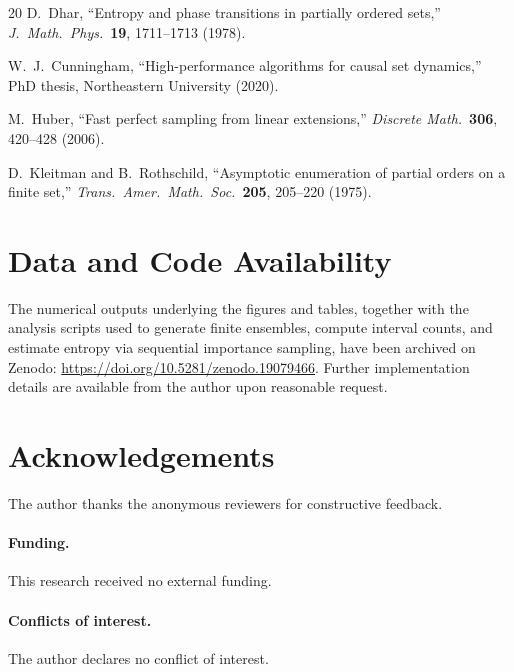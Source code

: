 \documentclass[12pt,a4paper]{article}
\begin{document}
\begin{thebibliography}{20}
D.~Dhar,
``Entropy and phase transitions in partially ordered sets,''
\emph{J.\ Math.\ Phys.}\ \textbf{19}, 1711--1713 (1978).

W.~J.~Cunningham,
``High-performance algorithms for causal set dynamics,''
PhD thesis, Northeastern University (2020).

M.~Huber,
``Fast perfect sampling from linear extensions,''
\emph{Discrete Math.}\ \textbf{306}, 420--428 (2006).

D.~Kleitman and B.~Rothschild,
``Asymptotic enumeration of partial orders on a finite set,''
\emph{Trans.\ Amer.\ Math.\ Soc.}\ \textbf{205}, 205--220 (1975).

\end{thebibliography}

\section*{Data and Code Availability}
The numerical outputs underlying the figures and tables,
together with the analysis scripts used to generate finite ensembles,
compute interval counts, and estimate entropy via sequential importance
sampling, have been archived on Zenodo:
\url{https://doi.org/10.5281/zenodo.19079466}.
Further implementation details are available from the author upon
reasonable request.

\section*{Acknowledgements}
The author thanks the anonymous reviewers for constructive feedback.

\paragraph{Funding.}
This research received no external funding.

\paragraph{Conflicts of interest.}
The author declares no conflict of interest.
\end{document}
